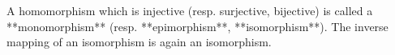 A homomorphism which is injective (resp. surjective, bijective) is called a **monomorphism** (resp. **epimorphism**, **isomorphism**). The inverse mapping of an isomorphism is again an isomorphism.
